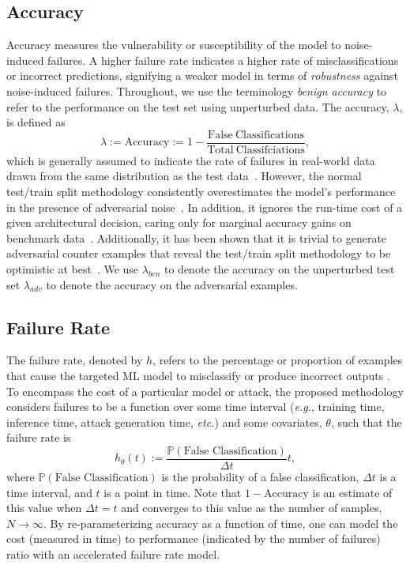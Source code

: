 \documentclass[journal]{IEEEtran}
\begin{document}
\subsection{Accuracy}
\label{acc}
  Accuracy measures the vulnerability or susceptibility of the model to noise-induced failures. A higher failure rate indicates a higher rate of misclassifications or incorrect predictions, signifying a weaker model in terms of \textit{robustness} against noise-induced failures. Throughout, we use the terminology \textit{benign accuracy} to refer to the performance on the test set using unperturbed data. The accuracy, $\lambda$, is defined as
\begin{equation}
    \lambda:= \mathrm{Accuracy} := 1 - \frac{\mathrm{False~Classifications}}{\mathrm{Total~Classifciations}},
    \label{eq:acc}
\end{equation}
which is generally assumed to indicate the rate of failures in real-world data drawn from the same distribution as the test data~\cite{tan2021critical}. However, the normal test/train split methodology consistently overestimates the model's performance in the presence of adversarial noise~\cite{croce_reliable_2020}. In addition, it ignores the run-time cost of a given architectural decision, caring only for marginal accuracy gains on benchmark data~\cite{desislavov2021compute,bailly2022effects}. Additionally, it has been shown that it is trivial to generate adversarial counter examples that reveal the test/train split methodology to be optimistic at best~\cite{carlini_towards_2017,adversarialpatch,pixelattack,hopskipjump,biggio_poisoning_2013,chakraborty_adversarial_2018,dohmatob_generalized_2019,meyers}. We use $\lambda_{ben}$ to denote the accuracy on the unperturbed test set $\lambda_{adv}$ to denote the accuracy on the adversarial examples.

\subsection{Failure Rate}
\label{failure_rate}
The failure rate, denoted by $h$, refers to the percentage or proportion of examples that cause the targeted ML model to misclassify or produce incorrect outputs \cite{meyers}. To encompass the cost of a particular model or attack, the proposed methodology considers failures to be a function over some time interval (\textit{e.g.}, training time, inference time, attack generation time, \textit{etc.}) and some covariates, $\theta$, such that the failure rate is
\[
    h_{ \theta}(t) :=  \frac{\mathbb{P}(\textrm{False~Classification})}{\Delta t} t,
\]
where $\mathbb{P}(\textrm{False~Classification})$ is the probability of a false classification, $\Delta t$ is a time interval, and $t$ is a point in time. Note that  $1 - \text{Accuracy}$  is an estimate of this value when $\Delta t = t$ and converges to this value as the number of samples, $N \rightarrow \infty$. By re-parameterizing accuracy as a function of time, one can model the cost (measured in time) to performance (indicated by the number of failures) ratio with an accelerated failure rate model.
\end{document}
